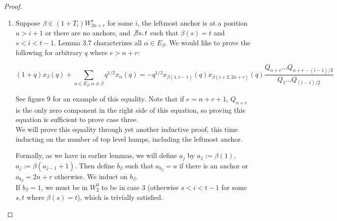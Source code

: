 \documentclass{amsart}
\begin{document}
\begin{proof}
\begin{enumerate}
	Note that in both corollary 3.2 and our inductive hypothesis (ii) we specified cases involving anchors. This allows the exact same logic from the proof of the first case to prove this case.
	
	\vspace{5mm}
	\item Suppose $\beta\in (1+T_i)W_{2n+r}^r$ for some $i$, the leftmost anchor is at a position $u>i+1$ or there are no anchors, and $\not\exists s,t$ such that $\beta(s)=t$ and $s<i<t-1$. Lemma $3.7$ characterizes all $\alpha\in E_\beta$. We would like to prove the following for arbitrary $q$ where $e>n+r$:
	
	$$(1+q)x_\beta(q)+\sum_{\alpha\in E_\beta,\alpha\not=\beta}q^{1/2}x_\alpha(q)=-q^{1/2}x_{\beta(1,i-1)}(q)x_{\beta(i+2,2n+r)}(q)\frac{Q_{n+r}...Q_{n+r-(i-1)/2}}{Q_1...Q_{(i-1)/2}}$$
	
	See figure 9 for an example of this equality. Note that if $e=n+r+1$, $Q_{n+r}$ is the only zero component in the right side of this equation, so proving this equation is sufficient to prove case three.
	\\
	
	We will prove this equality through yet another inductive proof, this time inducting on the number of top level humps, including the leftmost anchor.
	
	Formally, as we have in earlier lemmas, we will define $a_j$ by $a_1:=\beta(1)$, $a_j:=\beta(a_{j-1}+1)$. Then define $b_\beta$ such that $a_{b_\beta}=u$ if there is an anchor or $a_{b_\beta}=2n+r$ otherwise. We induct on $b_\beta$.
	\\
	
	If $b_\beta=1$, we must be in $W_2^0$ to be in case 3 (otherwise $s<i<t-1$ for some $s,t$ where $\beta(s)=t$), which is trivially satisfied. 
	\\
	

\end{enumerate}
\end{proof}
\end{document}

